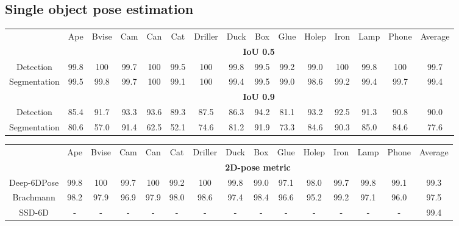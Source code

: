 \documentclass[conference]{IEEEtran}
\newcommand{\method}[1]{Deep-6DPose}
\begin{document}
\subsection{Single object pose estimation}\label{exp:hoi}\begin{table*}[!t]
\vspace{0.5cm}
   \centering
   \footnotesize
    \begin{center}
    \begin{tabular}{c| c c c c c c c c c c c c c c} 
&Ape &Bvise &Cam &Can &Cat &Driller &Duck &Box &Glue &Holep &Iron &Lamp &Phone &Average\\  
\Xhline{0.75pt}
	&\multicolumn{14}{c}{\textbf{IoU 0.5}} \\ 
Detection &99.8 &100 &99.7 &100 &99.5 &100 &99.8 &99.5 &99.2 &99.0 &100 &99.8 &100 &99.7\\ 
Segmentation &99.5 &99.8 &99.7 &100 &99.1 &100 &99.4 &99.5 &99.0 &98.6 &99.2 &99.4 &99.7 &99.4
\\  \hline

	&\multicolumn{14}{c}{\textbf{IoU 0.9}} \\
Detection 	 &85.4 &91.7 &93.3 &93.6 &89.3 &87.5 &86.3 &94.2 &81.1 &93.2 &92.5 &91.3 &90.8 &90.0\\ 
Segmentation &80.6 &57.0 &91.4 &62.5 &52.1 &74.6 &81.2 &91.9 &73.3 &84.6 &90.3 &85.0 &84.6 &77.6\\ \hline
    \end{tabular}
    \end{center}
    \vspace{-0.2cm}
    \caption{F1 score for 2D detection and segmentation of \method{} on LINEMOD dataset~\cite{ACCV12} for single object.} 
    \label{tab:2D_det_seg}
\end{table*}\begin{table*}[!t]
   \centering
   \footnotesize
   \begin{center}
    \begin{tabular}{c| c c c c c c c c c c c c c c} 
&Ape &Bvise &Cam &Can &Cat &Driller &Duck &Box &Glue &Holep &Iron &Lamp &Phone &Average\\  
\Xhline{1pt}
	&\multicolumn{14}{c}{\textbf{2D-pose metric}}\\ 
\method{} &99.8 &100 &99.7 &100 &99.2 &100 &99.8 &99.0 &97.1 &98.0 &99.7 &99.8 &99.1 &99.3\\ 
Brachmann\cite{CVPR16} &98.2 &97.9 &96.9 &97.9 &98.0 &98.6 &97.4 &98.4 &96.6 &95.2 &99.2 &97.1 &96.0 &97.5\\
SSD-6D\cite{SSD-6D} &- &- &- &- &- &- &- &- &- &- &- &- &- &99.4\\


\end{tabular}
\end{center}
\end{table*}
\end{document}
